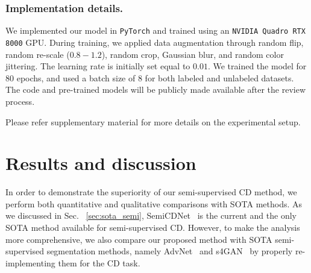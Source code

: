 \documentclass[runningheads]{llncs}
\begin{document}
\subsubsection{Implementation details.} We implemented our model in \texttt{PyTorch} and trained using an \texttt{NVIDIA Quadro RTX 8000} GPU. During training, we applied data augmentation through random flip, random re-scale ($0.8-1.2$), random crop, Gaussian blur, and random color jittering. The learning rate is initially set equal to $0.01$. We trained the model for 80 epochs, and  used a batch size of $8$ for both labeled and unlabeled datasets. The code and pre-trained models will be publicly made available after the review process. 

Please refer supplementary material for more details on the experimental setup.

\vspace{-4mm}
\section{Results and discussion}
\vspace{-3mm}
In order to demonstrate the superiority of our semi-supervised CD method, we perform both quantitative and qualitative comparisons with SOTA methods. As we discussed in Sec. ~\ref{sec:sota_semi}, SemiCDNet~\cite{SemiCDNet} is the current and the only SOTA method available for semi-supervised CD. However, to make the analysis more comprehensive, we also compare our proposed method with SOTA semi-supervised segmentation methods, namely AdvNet~\cite{advnet} and s4GAN~\cite{s4GAN} by properly re-implementing them for the CD task.
\end{document}
